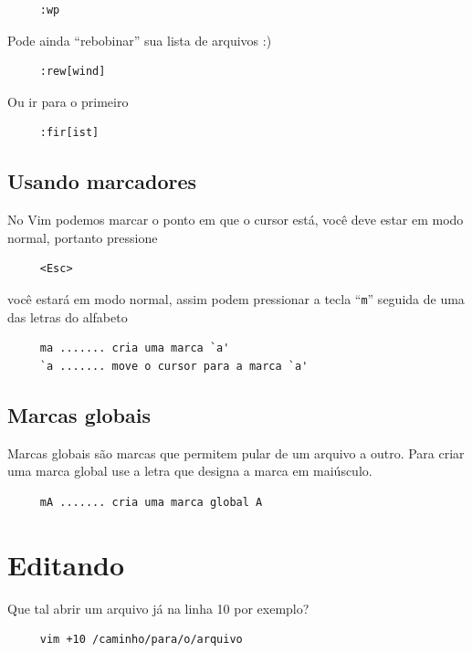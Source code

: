 \documentclass[10pt,a4paper,openany]{book}
\begin{document}
\begin{verbatim}
     :wp
\end{verbatim}

Pode ainda ``rebobinar'' sua lista de arquivos :)

\begin{verbatim}
     :rew[wind]
\end{verbatim}

Ou ir para o primeiro

\begin{verbatim}
     :fir[ist]
\end{verbatim}

\section{Usando marcadores}
\label{Usando marcadores}

No Vim podemos marcar o ponto em que o cursor está, você deve estar em
modo normal, portanto pressione

\begin{verbatim}
     <Esc>
\end{verbatim}

você estará em modo normal, assim podem pressionar a tecla ``\verb+m+''
seguida de uma das letras do alfabeto

\begin{verbatim}
     ma ....... cria uma marca `a'
     `a ....... move o cursor para a marca `a'
\end{verbatim}

\section{Marcas globais}
\label{Marcas globais}
Marcas globais são marcas que permitem pular de um arquivo a outro.
Para criar uma marca global use a letra que designa a marca em
maiúsculo.

\begin{verbatim}
     mA ....... cria uma marca global A
\end{verbatim}

\chapter{Editando}
\label{Editando}

Que tal abrir um arquivo já na linha 10 por exemplo?

\begin{verbatim}
     vim +10 /caminho/para/o/arquivo
\end{verbatim}
\end{document}
